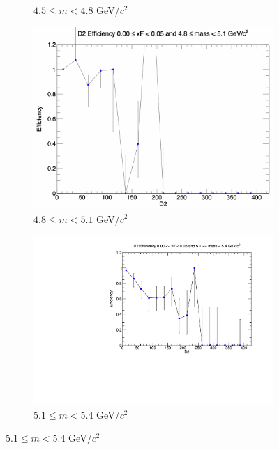 \documentclass[11pt]{article}
\begin{document}
\begin{figure}[p]
\begin{subfigure}[b]{0.32\textwidth}
        \caption{$4.5 \leq m < 4.8$ GeV/$c^2$}
    \end{subfigure}\hfill
    \begin{subfigure}[b]{0.32\textwidth}
        \centering
        \includegraphics[width=\textwidth]{./kTrackerEfficiencyPlots/D2_Efficiency_xF0_mass2.png}
        \caption{$4.8 \leq m < 5.1$ GeV/$c^2$}
    \end{subfigure}\vspace{0.5cm}
    \begin{subfigure}[b]{0.32\textwidth}
        \centering
        \includegraphics[width=\textwidth]{./kTrackerEfficiencyPlots/D2_Efficiency_xF0_mass3.pdf}
        \caption{$5.1 \leq m < 5.4$ GeV/$c^2$}
    \end{subfigure}\hfill

\end{figure}
\end{document}
